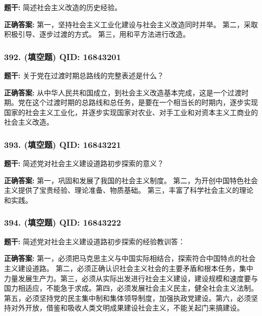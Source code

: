 \documentclass[12pt,UTF8]{ctexart}
\begin{document}
\textbf{题干:}
简述社会主义改造的历史经验。

\textbf{正确答案:}
第一，坚持社会主义工业化建设与社会主义改造同时并举。
第二，采取积极引导、逐步过渡的方式。
第三，用和平方法进行改造。

\vspace{0.3em}\hrulefill\vspace{0.7em}

\subsubsection*{392. (填空题) \small QID: 16843201}

\textbf{题干:}
关于党在过渡时期总路线的完整表述是什么？

\textbf{正确答案:}
从中华人民共和国成立，到社会主义改造基本完成，这是一个过渡时期。党在这个过渡时期的总路线和总任务，是要在一个相当长的时期内，逐步实现国家的社会主义工业化，并逐步实现国家对农业、对手工业和对资本主义工商业的社会主义改造。

\vspace{0.3em}\hrulefill\vspace{0.7em}

\subsubsection*{393. (填空题) \small QID: 16843221}

\textbf{题干:}
简述党对社会主义建设道路初步探索的意义？

\textbf{正确答案:}
第一，巩固和发展了我国的社会主义制度。
第二，为开创中国特色社会主义提供了宝贵经验、理论准备、物质基础。
第三，丰富了科学社会主义的理论和实践。

\vspace{0.3em}\hrulefill\vspace{0.7em}

\subsubsection*{394. (填空题) \small QID: 16843222}

\textbf{题干:}
简述党对社会主义建设道路初步探索的经验教训答：

\textbf{正确答案:}
第一，必须把马克思主义与中国实际相结合，探索符合中国特点的社会主义建设道路。
第二，必须正确认识社会主义社会的主要矛盾和根本任务，集中力量发展生产力。第三，必须从实际出发进行社会主义建设，建设规模和速度要与国力相适应，不能急于求成。第四，必须发展社会主义民主，健全社会主义法制。第五，必须坚持党的民主集中制和集体领导制度，加强执政党建设。第六，必须坚持对外开放，借鉴和吸收人类文明成果建设社会主义，不能关起门来搞建设。
\end{document}
